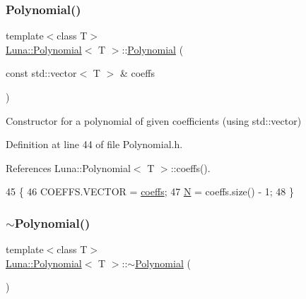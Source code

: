 \subsubsection{\texorpdfstring{Polynomial()}{Polynomial()}\hspace{0.1cm}{\footnotesize\ttfamily [3/3]}}
{\footnotesize\ttfamily template$<$class T$>$ \\
\hyperlink{classLuna_1_1Polynomial}{Luna\+::\+Polynomial}$<$ T $>$\+::\hyperlink{classLuna_1_1Polynomial}{Polynomial} (\begin{DoxyParamCaption}\item[{const std\+::vector$<$ T $>$ \&}]{coeffs }\end{DoxyParamCaption})\hspace{0.3cm}{\ttfamily [inline]}}



Constructor for a polynomial of given coefficients (using std\+::vector) 



Definition at line 44 of file Polynomial.\+h.



References Luna\+::\+Polynomial$<$ T $>$\+::coeffs().


\begin{DoxyCode}
45             \{
46                 COEFFS.VECTOR = \hyperlink{classLuna_1_1Polynomial_ab5e966c308b7e66d9c1c20666926db34}{coeffs};
47                 \hyperlink{namespaceHeat__plot_a7d050092798e28458a263710837bda77}{N} = coeffs.size() - 1;
48             \}
\end{DoxyCode}
\mbox{\label{classLuna_1_1Polynomial_ac43f479d0a2a0519e059d2ad942ead9b}} 
\subsubsection{\texorpdfstring{$\sim$\+Polynomial()}{~Polynomial()}}
{\footnotesize\ttfamily template$<$class T$>$ \\
\hyperlink{classLuna_1_1Polynomial}{Luna\+::\+Polynomial}$<$ T $>$\+::$\sim$\hyperlink{classLuna_1_1Polynomial}{Polynomial} (\begin{DoxyParamCaption}{ }\end{DoxyParamCaption})\hspace{0.3cm}{\ttfamily [inline]}}



